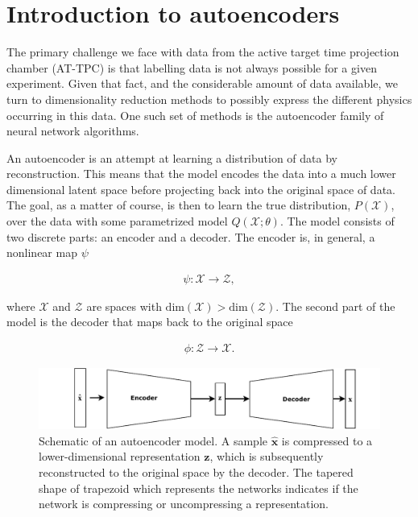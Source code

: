 

\section{Introduction to autoencoders}\label{sec:intro_autoenc}

The primary challenge we face with data from the active target time projection chamber (AT-TPC) is that labelling data is not always possible for a given experiment. Given that fact, and the considerable amount of data available, we turn to dimensionality reduction methods to possibly express the different physics occurring in this data. One such set of methods is the autoencoder family of neural network algorithms.

An autoencoder is an attempt at learning a distribution of data by reconstruction. This means that the model encodes the data into a much lower dimensional latent space before projecting back into the original space of data. The goal, as a matter of course, is then to learn the true distribution, $P(\mathcal{X})$, over the data with some parametrized model $Q(\mathcal{X};\theta)$. The model consists of two discrete parts: an encoder and a decoder. The encoder is, in general, a nonlinear map $\psi$

\begin{align}
  \psi: \mathcal{X} \rightarrow \mathcal{Z},
\end{align}

\noindent where $\mathcal{X} $ and $\mathcal{Z}$ are spaces with $\text{dim}(\mathcal{X}) > \text{dim}(\mathcal{Z})$.
The second part of the model is the decoder that maps back to the original space


\begin{align}
  \phi: \mathcal{Z} \rightarrow \mathcal{X}.
\end{align}

\begin{figure}[tb]
	\centering
	\includegraphics[width=\textwidth]{plots/autoencoder.pdf}
	\caption[Autoencoder schematic]{Schematic of an autoencoder model. A sample $\hat{\boldsymbol{x}}$ is compressed to a lower-dimensional representation $\boldsymbol{z}$, which is subsequently reconstructed to the original space by the decoder. The tapered shape of trapezoid which represents the networks indicates if the network is compressing or uncompressing a representation.}
	\label{fig:autoencoder}
\end{figure}

